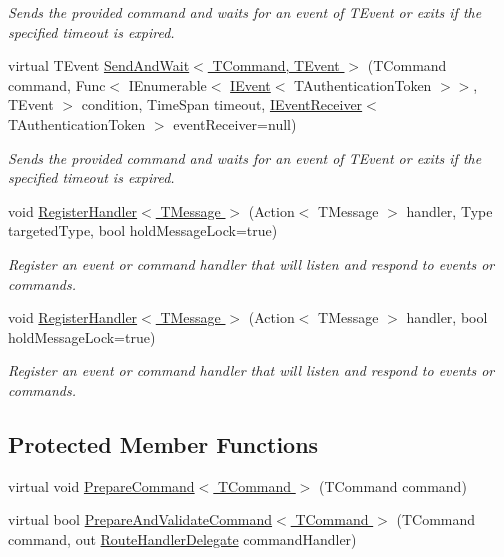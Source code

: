 \begin{DoxyCompactItemize}
\begin{DoxyCompactList}\small\item\em Sends the provided {\itshape command}  and waits for an event of {\itshape T\+Event}  or exits if the specified timeout is expired. \end{DoxyCompactList}\item 
virtual T\+Event \hyperlink{classCqrs_1_1Akka_1_1Commands_1_1AkkaCommandBus_a0bd9b9e4522286eba7af71d3ab400d5f}{Send\+And\+Wait$<$ T\+Command, T\+Event $>$} (T\+Command command, Func$<$ I\+Enumerable$<$ \hyperlink{interfaceCqrs_1_1Events_1_1IEvent}{I\+Event}$<$ T\+Authentication\+Token $>$$>$, T\+Event $>$ condition, Time\+Span timeout, \hyperlink{interfaceCqrs_1_1Events_1_1IEventReceiver}{I\+Event\+Receiver}$<$ T\+Authentication\+Token $>$ event\+Receiver=null)
\begin{DoxyCompactList}\small\item\em Sends the provided {\itshape command}  and waits for an event of {\itshape T\+Event}  or exits if the specified timeout is expired. \end{DoxyCompactList}\item 
void \hyperlink{classCqrs_1_1Akka_1_1Commands_1_1AkkaCommandBus_a8ed33fb315493d52470bc3bc2bf076f2}{Register\+Handler$<$ T\+Message $>$} (Action$<$ T\+Message $>$ handler, Type targeted\+Type, bool hold\+Message\+Lock=true)
\begin{DoxyCompactList}\small\item\em Register an event or command handler that will listen and respond to events or commands. \end{DoxyCompactList}\item 
void \hyperlink{classCqrs_1_1Akka_1_1Commands_1_1AkkaCommandBus_adc21072d2b02c745747c4d585a53dba3}{Register\+Handler$<$ T\+Message $>$} (Action$<$ T\+Message $>$ handler, bool hold\+Message\+Lock=true)
\begin{DoxyCompactList}\small\item\em Register an event or command handler that will listen and respond to events or commands. \end{DoxyCompactList}\end{DoxyCompactItemize}
\subsection*{Protected Member Functions}
\begin{DoxyCompactItemize}
\item 
virtual void \hyperlink{classCqrs_1_1Akka_1_1Commands_1_1AkkaCommandBus_a9755a84c0b971ce0862abdc2783422ce}{Prepare\+Command$<$ T\+Command $>$} (T\+Command command)
\item 
virtual bool \hyperlink{classCqrs_1_1Akka_1_1Commands_1_1AkkaCommandBus_ae3e5f1725bceb0359aedb74ded530858}{Prepare\+And\+Validate\+Command$<$ T\+Command $>$} (T\+Command command, out \hyperlink{classCqrs_1_1Bus_1_1RouteHandlerDelegate}{Route\+Handler\+Delegate} command\+Handler)
\end{DoxyCompactItemize}
